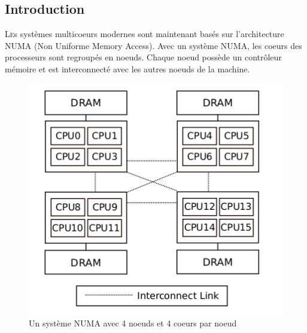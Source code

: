 \subsection{Introduction}

  \lettrine[nindent=0em,lines=3]{L} es systèmes multicoeurs modernes sont
  maintenant basés sur l'architecture NUMA (Non Uniforme Memory Access). Avec un
  système NUMA, les coeurs des processeurs sont regroupés en noeuds. Chaque
  noeud possède un contrôleur mémoire et est interconnecté avec les autres
  noeuds de la machine.

  \begin{figure}[H]
    \includegraphics[scale=0.4]{img/numa_arch.png}
    \caption{Un système NUMA avec 4 noeuds et 4 coeurs par noeud}
    \label{f:numa_arch}
  \end{figure}

